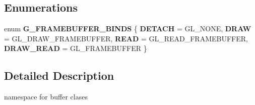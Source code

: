 \subsection*{Enumerations}
\begin{DoxyCompactItemize}
\item 
\mbox{\label{namespace_geometry_engine_1_1_geometry_buffer_ae4923c87de2056a1df7228000a2fbad9}} 
enum {\bfseries G\+\_\+\+F\+R\+A\+M\+E\+B\+U\+F\+F\+E\+R\+\_\+\+B\+I\+N\+DS} \{ {\bfseries D\+E\+T\+A\+CH} = G\+L\+\_\+\+N\+O\+NE, 
{\bfseries D\+R\+AW} = G\+L\+\_\+\+D\+R\+A\+W\+\_\+\+F\+R\+A\+M\+E\+B\+U\+F\+F\+ER, 
{\bfseries R\+E\+AD} = G\+L\+\_\+\+R\+E\+A\+D\+\_\+\+F\+R\+A\+M\+E\+B\+U\+F\+F\+ER, 
{\bfseries D\+R\+A\+W\+\_\+\+R\+E\+AD} = G\+L\+\_\+\+F\+R\+A\+M\+E\+B\+U\+F\+F\+ER
 \}
\end{DoxyCompactItemize}


\subsection{Detailed Description}
namespace for buffer clases 